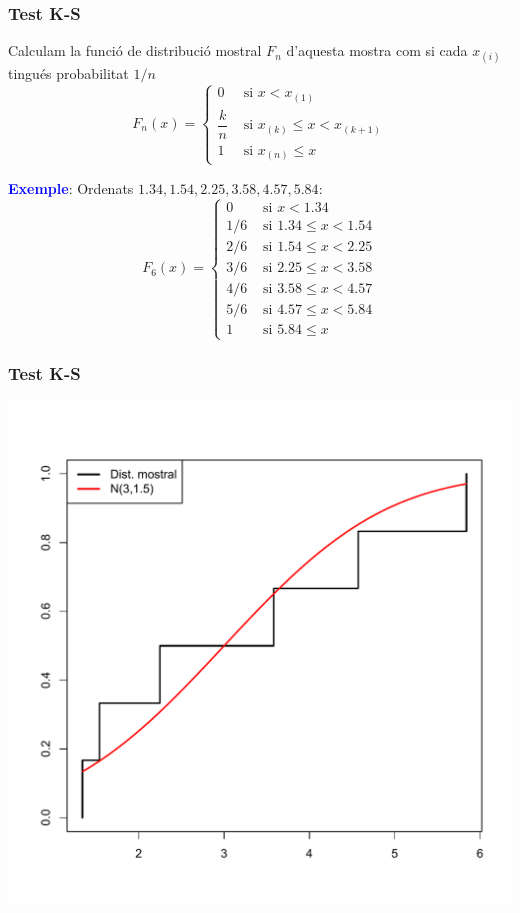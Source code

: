 \documentclass[12pt,t]{beamer}
\newcommand{\blue}[1]{\textcolor{blue}{#1}}
\renewcommand{\emph}[1]{{\color{red}#1}}
\renewcommand{\leq}{\leqslant}
\theoremstyle{plain}
\theoremstyle{definition}
\begin{document}
\begin{frame}
\frametitle{Test K-S}

Calculam la \emph{funció de distribució mostral} $F_{n}$
d'aquesta mostra com si cada $x_{(i)}$ tingués probabilitat $1/n$
$$
F_n(x)=\left\{\begin{array}{ll}
0 &\mbox{ si } x< x_{(1)} \\
\dfrac{k}{n}&\mbox{ si } x_{(k)}\leq x < x_{(k+1)}\\[2ex]
1 & \mbox{ si } x_{(n)} \leq x
\end{array}
\right.
$$


\blue{\bf Exemple}: Ordenats $1.34, 1.54, 2.25, 3.58, 4.57, 5.84$:
$$
F_6(x)=\left\{\begin{array}{ll}
0 &\mbox{ si } x< 1.34 \\
1/6 &\mbox{ si } 1.34\leq x <1.54\\
2/6 &\mbox{ si } 1.54\leq x <2.25\\
3/6 &\mbox{ si } 2.25\leq x <3.58\\
4/6 &\mbox{ si } 3.58\leq x <4.57\\
5/6 &\mbox{ si } 4.57\leq x <5.84\\
1 &\mbox{ si } 5.84\leq x 
\end{array}
\right.
$$

\end{frame}






\begin{frame}[fragile]
\frametitle{Test K-S}
\vspace*{-4ex}

\begin{center}
\includegraphics[width=0.8\linewidth]{KS2}
\end{center}


\end{frame}
\end{document}
